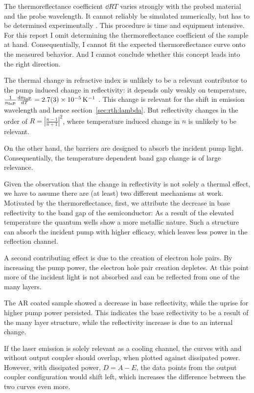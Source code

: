 The thermoreflectance coefficient $\dd{R}{T}$
varies strongly
with the probed material
and the probe wavelength.
It cannot reliably be simulated numerically,
but has to be determined experimentally
\cite{Pierscinski2009}.
This procedure is time
and equipment intensive.
For this report I omit
determining the thermoreflectance coefficient
of the sample at hand.
Consequentially,
I cannot fit the expected thermoreflectance curve
onto the measured behavior.
And I cannot conclude
whether this concept
leads into the right direction.

The thermal change
in refractive index
is unlikely to be
a relevant contributor
to the pump induced
change in reflectivity:
it depends only weakly on temperature,
$\frac{1}{n_\mathrm{InP}}\frac{\mathrm{d} n_\mathrm{InP}}{\mathrm{d} T}=
2.7(3)\times10^{-5}\,\mathrm{K}^{-1}$
\cite{SpringerMat}.
This change is relevant
for the shift in emission wavelength
and hence section~\ref{sec:rth:lambda}.
But reflectivity
changes in the order of
$R=|\frac{n-1}{n+1}|^2$,
where temperature induced change in $n$
is unlikely to be relevant.

On the other hand,
the barriers are designed to absorb
the incident pump light.
Consequentially,
the temperature dependent band gap change
is of large relevance.

Given the observation
that the change in reflectivity
is not solely a thermal
effect,
we have to assume
there are
(at least)
two different mechanisms
at work.
Motivated by the thermoreflectance,
first,
we attribute
the decrease in base reflectivity
to the band gap of the semiconductor:
As a result of
the elevated temperature
the quantum wells
show a more metallic nature.
Such a structure can absorb
the incident pump
with higher efficacy,
which leaves
less power in the reflection channel.

A second contributing effect
is due to the creation
of electron hole pairs.
By increasing the pump power,
the electron hole pair creation depletes.
At this point
more of the incident light
is not absorbed
and can be reflected
from one of the many layers.

The AR coated sample
showed a decrease
in base reflectivity,
while the uprise
for higher pump power
persisted.
This indicates
the base reflectivity
to be a result
of the many layer structure,
while the reflectivity increase
is due to an internal change.

If the laser emission
is solely relevant
as a cooling channel,
the curves with and without output coupler
should overlap,
when plotted against dissipated power.
However,
with dissipated power,
$D=A-E$,
the data points
from the output coupler configuration
would shift left,
which increases the difference between
the two curves
even more.

